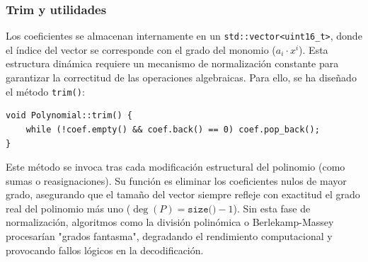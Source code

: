 \subsubsection{Trim y utilidades}

Los coeficientes se almacenan internamente en un \texttt{std::vector<uint16\_t>}, donde el índice del vector se corresponde con el grado del monomio ($a_i \cdot x^i$). Esta estructura dinámica requiere un mecanismo de normalización constante para garantizar la correctitud de las operaciones algebraicas. Para ello, se ha diseñado el método \texttt{trim()}:

\begin{lstlisting}[style=CodigoCPP, caption={Implementación del método \texttt{trim()} para la eliminación de coeficientes nulos en los términos de mayor grado.}, label={lst:poly_trim}]
void Polynomial::trim() {
    while (!coef.empty() && coef.back() == 0) coef.pop_back();
}
\end{lstlisting}

Este método se invoca tras cada modificación estructural del polinomio (como sumas o reasignaciones). Su función es eliminar los coeficientes nulos de mayor grado, asegurando que el tamaño del vector siempre refleje con exactitud el grado real del polinomio más uno ($\deg(P) = \texttt{size()} - 1$). Sin esta fase de normalización, algoritmos como la división polinómica o Berlekamp-Massey procesarían "grados fantasma", degradando el rendimiento computacional y provocando fallos lógicos en la decodificación.

